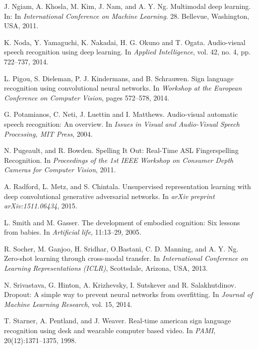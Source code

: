 \begin{thebibliography}{99}
{
  J. Ngiam, A. Khosla, M. Kim, J. Nam, and A. Y. Ng. 
  Multimodal deep learning. In:
  In \textit{International Conference on Machine Learning}.  28. 
  Bellevue, Washington, USA, 2011.

  K. Noda, Y. Yamaguchi, K. Nakadai, H. G. Okuno and T. Ogata. Audio-visual
  speech recognition using deep learning.  In \textit{Applied Intelligence},
  vol. 42, no. 4, pp. 722–737, 2014.

 L. Pigou, S. Dieleman, P. J. Kindermans, and B. Schrauwen.
  Sign language recognition using convolutional neural networks. In
  \textit{Workshop at the European Conference on Computer Vision},
  pages 572--578, 2014.

  G. Potamianos, C. Neti, J. Luettin and  I. Matthews. Audio-visual
  automatic speech recognition: An overview. In \textit{Issues in Visual
  and Audio-Visual Speech Processing, MIT Press}, 2004.

  N. Pugeault, and R. Bowden. Spelling It Out: Real-Time ASL
  Fingerspelling Recognition. In \textit{Proceedings of the 1st IEEE
  Workshop on Consumer Depth Cameras for Computer Vision}, 2011.

  A. Radford, L. Metz, and S. Chintala. Unsupervised representation
  learning with deep convolutional generative adversarial networks. In 
  \textit{arXiv preprint arXiv:1511.06434}, 2015.

  L. Smith and M. Gasser. The development of embodied cognition:
  Six lessons from babies. In \textit{Artificial life}, 11:13--29, 2005.

  R. Socher, M. Ganjoo, H. Sridhar, O.Bastani, C. D. Manning, and
  A. Y. Ng. Zero-shot learning through cross-modal transfer.
  In \textit{International Conference on Learning Representations (ICLR)},
  Scottsdale, Arizona, USA, 2013.

  N. Srivastava, G. Hinton, A. Krizhevsky, I. Sutskever and R. Salakhutdinov.
  Dropout: A simple way to prevent neural networks from overfitting. In
  \textit{Journal of Machine Learning Research}, vol. 15, 2014.

  T. Starner, A. Pentland, and J. Weaver. Real-time american sign language
  recognition using desk and wearable computer based video. 
  In \textit{PAMI}, 20(12):1371–1375, 1998.

}
\end{thebibliography}
